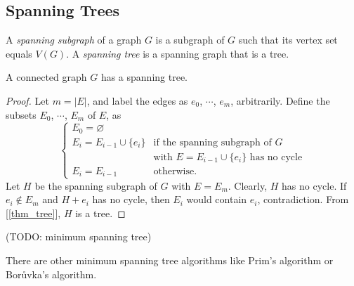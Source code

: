     \subsection{Spanning Trees}
        \begin{defn} \label{def_spanning}
            A \emph{spanning subgraph} of a graph $G$ is a subgraph of $G$ such that its vertex set equals $V(G)$. A \emph{spanning tree} is a spanning graph that is a tree.
        \end{defn}
        
        \begin{thm} \label{thm_spanning_tree}
            A connected graph $G$ has a spanning tree.
        \end{thm}
        
        \begin{proof}
            Let $m = |E|$, and label the edges as $e_0$, $\cdots$, $e_m$, arbitrarily. Define the subsets $E_0$, $\cdots$, $E_m$ of $E$, as \begin{displaymath} \begin{cases}
                E_0 = \varnothing \\
                E_i = E_{i-1} \cup \{e_i\} & \text{if the spanning subgraph of $G$} \\
                & \text{with $E = E_{i-1} \cup \{e_i\}$ has no cycle} \\
                E_i = E_{i-1} & \text{otherwise.}
            \end{cases} \end{displaymath}
            Let $H$ be the spanning subgraph of $G$ with $E = E_m$. Clearly, $H$ has no cycle. If $e_i \notin E_m$ and $H+e_i$ has no cycle, then $E_i$ would contain $e_i$, contradiction. From [\ref{thm_tree}], $H$ is a tree.
        \end{proof}
        
        (TODO: minimum spanning tree)
        
        There are other minimum spanning tree algorithms like Prim's algorithm or Borůvka's algorithm.
    
